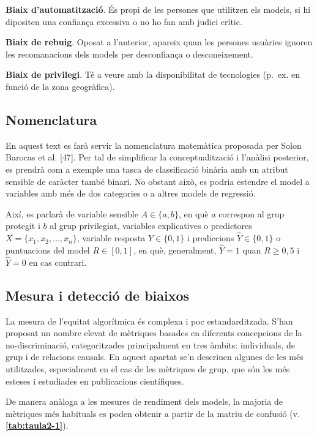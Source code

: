 \documentclass[CAT]{TFUOC}%
\begin{document}
\textbf{Biaix d'automatització}. És propi de les persones que utilitzen els models, si hi dipositen una confiança excessiva o no ho fan amb judici crític.

\textbf{Biaix de rebuig}. Oposat a l'anterior, apareix quan les persones usuàries ignoren les recomanacions dels models per desconfiança o desconeixement.

\textbf{Biaix de privilegi}. Té a veure amb la disponibilitat de tecnologies (p.~ex. en funció de la zona geogràfica).

\subsection{Nomenclatura}\label{nomenclatura}

En aquest text es farà servir la nomenclatura matemàtica proposada per Solon Barocas et al. {[}47{]}. Per tal de simplificar la conceptualització i l'anàlisi posterior, es prendrà com a exemple una tasca de classificació binària amb un atribut sensible de caràcter també binari. No obstant això, es podria estendre el model a variables amb més de dos categories o a altres models de regressió.

Així, es parlarà de variable sensible \(A \in \{a, b\}\), en què \(a\) correspon al grup protegit i \(b\) al grup privilegiat, variables explicatives o predictores \(X = \{x_1, x_2, \dots, x_n\}\), variable resposta \(Y \in \{0, 1\}\) i prediccions \(\hat Y \in \{0, 1\}\) o puntuacions del model \(R \in [0, 1]\), en què, generalment, \(\hat Y = 1\) quan \(R \geq 0,5\) i \(\hat Y = 0\) en cas contrari.

\subsection{Mesura i detecció de biaixos}\label{mesura-i-detecciuxf3-de-biaixos}

La mesura de l'equitat algorítmica és complexa i poc estandarditzada. S'han proposat un nombre elevat de mètriques basades en diferents concepcions de la no-discriminació, categoritzades principalment en tres àmbits: individuals, de grup i de relacions causals. En aquest apartat se'n descriuen algunes de les més utilitzades, especialment en el cas de les mètriques de grup, que són les més esteses i estudiades en publicacions científiques.

De manera anàloga a les mesures de rendiment dels models, la majoria de mètriques més habituals es poden obtenir a partir de la matriu de confusió (v. \textbf{\autoref{tab:taula2-1}}).
\end{document}
